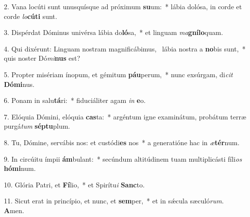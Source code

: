 2. Vana locúti sunt unusquísque ad próximum \textbf{su}um:~*  lábia dolósa, in corde et corde \textit{lo}\textbf{cú}\textbf{ti} sunt.\

3. Dispérdat Dóminus univérsa lábia do\textbf{ló}sa,~*  et linguam \textit{ma}\textbf{gní}\textbf{lo}quam.\

4. Qui dixérunt: Linguam nostram magnificábimus, \dag\  lábia nostra a \textbf{no}bis sunt,~*  quis noster Dó\textit{mi}\textbf{nus} est?\

5. Propter misériam ínopum, et gémitum \textbf{páu}perum,~*  nunc exsúrgam, di\textit{cit} \textbf{Dó}\textbf{mi}nus.\

6. Ponam in salu\textbf{tá}ri:~*  fiduciáliter agam \textit{in} \textbf{e}o.\

7. Elóquia Dómini, elóquia \textbf{cas}ta:~*  argéntum igne examinátum, probátum terræ purgá\textit{tum} \textbf{sép}\textbf{tu}plum.\

8. Tu, Dómine, servábis nos: et custódi\textbf{es} nos~*  a generatióne hac in \textit{æ}\textbf{tér}num.\

9. In circúitu ímpii \textbf{ám}bulant:~*  secúndum altitúdinem tuam multiplicásti fíli\textit{os} \textbf{hó}\textbf{mi}num.\

10. Glória Patri, et \textbf{Fí}lio,~*  et Spirítu\textit{i} \textbf{Sanc}to.\

11. Sicut erat in princípio, et nunc, et \textbf{sem}per,~*  et in sǽcula sæculó\textit{rum}. \textbf{A}men.\

